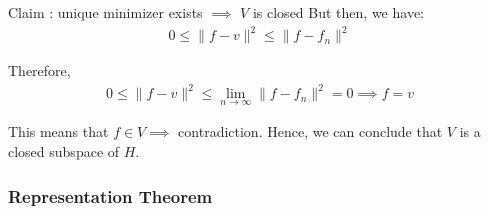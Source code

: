 \begin{proof*}
\begin{subproof}{\newline Claim : unique minimizer exists $\implies$ $V$ is closed}
        \noindent But then, we have:
        \begin{align*}
            0 \le \|f - v\|^2 \le \|f - f_n\|^2
        \end{align*}

        \noindent Therefore,
        \begin{align*}
            0 \le \|f - v\|^2 \le \lim_{n\to\infty} \|f - f_n\|^2 = 0 \implies f = v
        \end{align*}

        \noindent This means that $f \in V \implies$ contradiction. Hence, we can conclude that $V$ is a closed subspace of $H$.
    \end{subproof}
\end{proof*}


\subsubsection{Representation Theorem}
